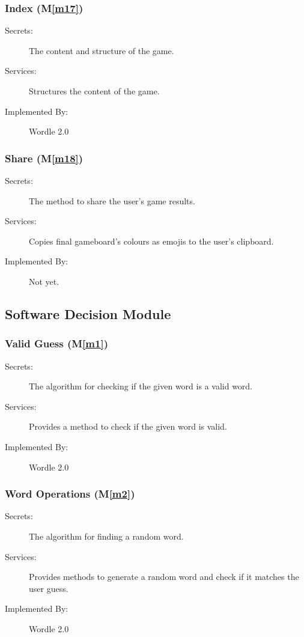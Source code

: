 \documentclass[12pt, titlepage]{article}
\newcommand{\mref}[1]{M\ref{#1}}
\begin{document}
	\subsubsection{Index (\mref{m17})}
	\begin{description}
		\item[Secrets:]The content and structure of the game.
		\item[Services:]Structures the content of the game.
		\item[Implemented By:] Wordle 2.0
	\end{description}
	
	\subsubsection{Share (\mref{m18})}
	\begin{description}
		\item[Secrets:]The method to share the user's game results.
		\item[Services:] Copies final gameboard's colours as emojis to the user's clipboard.
		\item[Implemented By:] Not yet.
	\end{description}
	
	\subsection{Software Decision Module}
	
	\subsubsection{Valid Guess (\mref{m1})}
	\begin{description}
		\item[Secrets:]The algorithm for checking if the given word is a valid word.
		\item[Services:]Provides a method to check if the given word is valid.
		\item[Implemented By:] Wordle 2.0
	\end{description}
	
	\subsubsection{Word Operations (\mref{m2})}
	\begin{description}
		\item[Secrets:]The algorithm for finding a random word.
		\item[Services:]Provides methods to generate a random word and check if it matches the user guess.
		\item[Implemented By:] Wordle 2.0
	\end{description}
	
\end{document}

